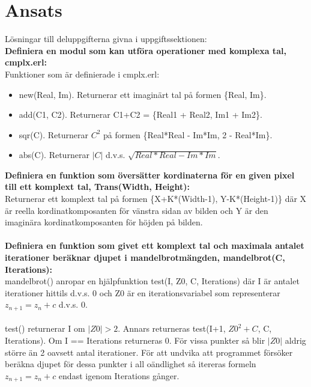 \documentclass[a4paper, 11pt]{article}
\begin{document}
\section{Ansats}
Lösningar till deluppgifterna givna i uppgiftssektionen: 
\\\textbf{Definiera en modul som kan utföra operationer med komplexa tal, cmplx.erl:}
\\Funktioner som är definierade i cmplx.erl:
\begin{itemize}
 \item new(Real, Im). Returnerar ett imaginärt tal på formen \{Real, Im\}. 
 \item add(C1, C2). Returnerar C1+C2 = \{Real1 + Real2, Im1 + Im2\}. 
 \item sqr(C). Returnerar \begin{math} C^2 \end{math} på formen \{Real*Real - Im*Im, 2 - Real*Im\}. 
 \item abs(C). Returnerar \begin{math} |C| \end{math} d.v.s. \begin{math} \sqrt{Real*Real - Im*Im} \end{math}. 
\end{itemize}
\textbf{Definiera en funktion som översätter kordinaterna för en given pixel till ett komplext tal, Trans(Width, Height):}
\\Returnerar ett komplext tal på formen \{X+K*(Width-1), Y-K*(Height-1)\} där X är reella kordinatkomposanten för vänstra sidan av bilden och Y är den imaginära kordinatkomposanten för höjden på bilden. 
\\\\\textbf{Definiera en funktion som givet ett komplext tal och maximala antalet iterationer beräknar djupet i mandelbrotmängden, mandelbrot(C, Iterations):}
\\mandelbrot() anropar en hjälpfunktion test(I, Z0, C, Iterations) där I är antalet iterationer hittils d.v.s. 0 och Z0 är en iterationsvariabel som representerar \begin{math} z_{n+1} = z_{n} + c \end{math} d.v.s. 0. 
\\\\test() returnerar I om \begin{math} |Z0| > 2 \end{math}. Annars returneras test(I+1, \begin{math} Z0^2 + C \end{math}, C, Iterations). Om I == Iterations returneras 0. För vissa punkter så blir \begin{math} |Z0| \end{math} aldrig större än 2 oavsett antal iterationer. För att undvika att programmet försöker beräkna djupet för dessa punkter i all oändlighet så itereras formeln \begin{math} z_{n+1} = z_{n} + c \end{math} endast igenom Iterations gånger.
\end{document}
